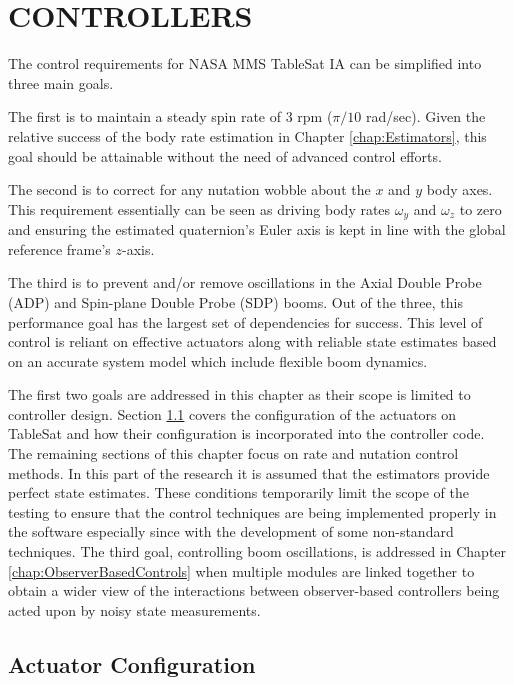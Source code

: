 
\chapter{CONTROLLERS}
\label{chap:Controllers}

The control requirements for NASA MMS TableSat IA can be simplified into three main goals.

The first is to maintain a steady spin rate of 3 rpm ($\pi/10$ rad/sec).  Given the relative success of the body rate estimation in Chapter \ref{chap:Estimators}, this goal should be attainable without the need of advanced control efforts.

The second is to correct for any nutation wobble about the $x$ and $y$ body axes.  This requirement essentially can be seen as driving body rates $\omega_y$ and $\omega_z$ to zero and ensuring the estimated quaternion's Euler axis is kept in line with the global reference frame's $z$-axis.

The third is to prevent and/or remove oscillations in the Axial Double Probe (ADP) and Spin-plane Double Probe (SDP) booms.  Out of the three, this performance goal has the largest set of dependencies for success.  This level of control is reliant on effective actuators along with reliable state estimates based on an accurate system model which include flexible boom dynamics.

The first two goals are addressed in this chapter as their scope is limited to controller design.  Section \ref{sec:ActuatorConfiguration} covers the configuration of the actuators on TableSat and how their configuration is incorporated into the controller code.  The remaining sections of this chapter focus on rate and nutation control methods.  In this part of the research it is assumed that the estimators provide perfect state estimates.  These conditions temporarily limit the scope of the testing to ensure that the control techniques are being implemented properly in the software especially since with the development of some non-standard techniques.  The third goal, controlling boom oscillations, is addressed in Chapter \ref{chap:ObserverBasedControls} when multiple modules are linked together to obtain a wider view of the interactions between observer-based controllers being acted upon by noisy state measurements.

\section{Actuator Configuration}
\label{sec:ActuatorConfiguration}

